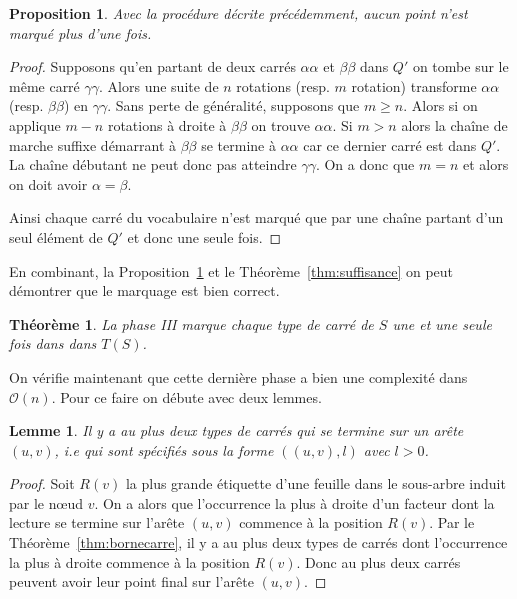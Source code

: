 \documentclass[10pt,letterpaper,oneside]{article}
\newtheorem{lemme}{Lemme}
\newtheorem{proposition}{Proposition}
\newtheorem{theorem}{Théorème}
\newcommand{\bigo}{\mathcal{O}}
\begin{document}
\begin{proposition} \label{prop:correct}
    Avec la procédure décrite précédemment, aucun point n'est marqué plus d'une fois.
\end{proposition}
\begin{proof}
    Supposons qu'en partant de deux carrés $\alpha\alpha$ et $\beta\beta$ dans $Q'$ on tombe sur le même carré $\gamma\gamma$. Alors une suite de $n$ rotations (resp. $m$ rotation) transforme  $\alpha\alpha$ (resp. $\beta\beta$) en $\gamma\gamma$. Sans perte de généralité, supposons que $m\geq n$. Alors si on applique $m-n$ rotations à droite à $\beta\beta$ on trouve $\alpha\alpha$. Si $m>n$ alors la chaîne de marche suffixe démarrant à $\beta\beta$ se termine à $\alpha\alpha$ car ce dernier carré est dans $Q'$. La chaîne débutant ne peut donc pas atteindre $\gamma\gamma$. On a donc que $m=n$ et alors on doit avoir $\alpha=\beta$.
    
    Ainsi chaque carré du vocabulaire n'est marqué que par une chaîne partant d'un seul élément de $Q'$ et donc une seule fois.
\end{proof}

En combinant, la Proposition~\ref{prop:correct} et le Théorème~\ref{thm:suffisance} on peut démontrer que le marquage est bien correct.
\begin{theorem}
    La phase III marque chaque type de carré de $S$ une et une seule fois dans dans $T(S)$.
\end{theorem}

On vérifie maintenant que cette dernière phase a bien une complexité dans $\bigo(n)$. Pour ce faire on débute avec deux lemmes.

\begin{lemme} \label{lem:maxarete}
    Il y a au plus deux types de carrés qui se termine sur un arête $(u,v)$, \emph{i.e} qui sont spécifiés sous la forme $((u,v),l)$ avec $l>0$.
\end{lemme}
\begin{proof}
    Soit $R(v)$ la plus grande étiquette d'une feuille dans le sous-arbre induit par le nœud $v$. On a alors que l'occurrence la plus à droite d'un facteur dont la lecture se termine sur l'arête $(u,v)$ commence à la position $R(v)$. Par le Théorème~\ref{thm:bornecarre}, il y a au plus deux types de carrés dont l'occurrence la plus à droite commence à la position $R(v)$. Donc au plus deux carrés peuvent avoir leur point final sur l'arête $(u,v)$.
\end{proof}
\end{document}
